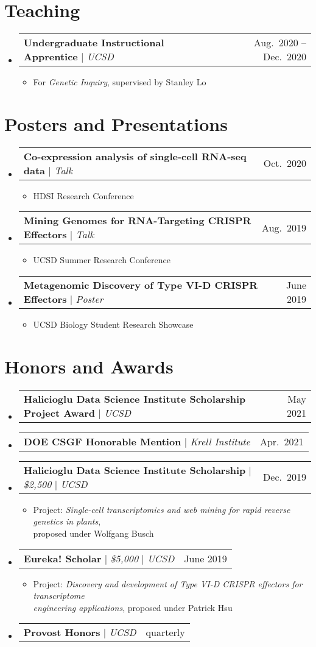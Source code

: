 \documentclass[letterpaper,11pt]{article}
\makeatletter
\newcommand{\resumeItem}[1]{
  \item\small{
    {#1 \vspace{-2pt}}
  }
}
\newcommand{\resumeProjectHeading}[2]{
    \item
    \begin{tabular*}{0.97\textwidth}{l@{\extracolsep{\fill}}r}
      \small#1 & #2 \\
    \end{tabular*}\vspace{-7pt}
}
\newcommand{\resumeSubHeadingListStart}{\begin{itemize}[leftmargin=0.15in, label={}]}
\newcommand{\resumeSubHeadingListEnd}{\end{itemize}}
\newcommand{\resumeItemListStart}{\begin{itemize}}
\newcommand{\resumeItemListEnd}{\end{itemize}\vspace{-5pt}}
\makeatother
\begin{document}
\section{Teaching}
  \resumeSubHeadingListStart
    \resumeProjectHeading
      {\textbf{Undergraduate Instructional Apprentice} $|$ \emph{UCSD}}{Aug.\ 2020 -- Dec.\ 2020}
      \resumeItemListStart
        \resumeItem{For \emph{Genetic Inquiry}, supervised by Stanley Lo}
      \resumeItemListEnd
  \resumeSubHeadingListEnd

\section{Posters and Presentations}
    \resumeSubHeadingListStart
    \resumeProjectHeading
          {\textbf{Co-expression analysis of single-cell RNA-seq data} $|$ \emph{Talk}}{Oct.\ 2020}
          \resumeItemListStart
            \resumeItem{HDSI Research Conference}
          \resumeItemListEnd
      \resumeProjectHeading
          {\textbf{Mining Genomes for RNA-Targeting CRISPR Effectors} $|$ \emph{Talk}}{Aug.\ 2019}
          \resumeItemListStart
            \resumeItem{UCSD Summer Research Conference}
          \resumeItemListEnd
      \resumeProjectHeading
          {\textbf{Metagenomic Discovery of Type VI-D CRISPR Effectors} $|$ \emph{Poster}}{June 2019}
          \resumeItemListStart
            \resumeItem{UCSD Biology Student Research Showcase}
          \resumeItemListEnd
    \resumeSubHeadingListEnd

\section{Honors and Awards}
    \resumeSubHeadingListStart
      \resumeProjectHeading
          {\textbf{Halicioglu Data Science Institute Scholarship Project Award} $|$ \emph{UCSD}}{May 2021}
      \resumeProjectHeading
          {\textbf{DOE CSGF Honorable Mention} $|$ \emph{Krell Institute}}{Apr.\ 2021}
      \resumeProjectHeading
          {\textbf{Halicioglu Data Science Institute Scholarship} $|$ \emph{\$2,500} $|$ \emph{UCSD}}{Dec.\ 2019}
          \resumeItemListStart
            \resumeItem{Project: \emph{Single-cell transcriptomics and web mining for rapid reverse genetics in plants},\\ proposed under Wolfgang Busch}
          \resumeItemListEnd
       \resumeProjectHeading
          {\textbf{Eureka! Scholar} $|$ \emph{\$5,000} $|$ \emph{UCSD}}{June 2019}
          \resumeItemListStart
            \resumeItem{Project: \emph{Discovery and development of Type VI-D CRISPR effectors for transcriptome\\ engineering applications}, proposed under Patrick Hsu}
          \resumeItemListEnd
       \resumeProjectHeading
          {\textbf{Provost Honors} $|$ \emph{UCSD}}{quarterly}
    \resumeSubHeadingListEnd
\end{document}
